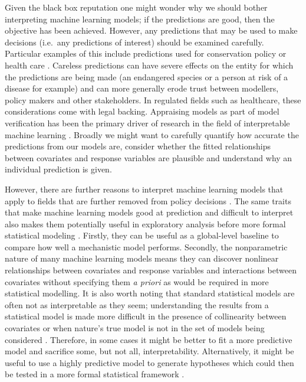 \documentclass[12pt]{article}
\begin{document}
Given the black box reputation one might wonder why we should bother interpreting machine learning models; if the predictions are good, then the objective has been achieved.
However, any predictions that may be used to make decisions (i.e.~any predictions of interest) should be examined carefully.
Particular examples of this include predictions used for conservation policy or health care \citep{vayena2018machine}.
Careless predictions can have severe effects on the entity for which the predictions are being made (an endangered species or a person at risk of a disease for example) and can more generally erode trust between modellers, policy makers and other stakeholders.
In regulated fields such as healthcare, these considerations come with legal backing.
Appraising models as part of model verification has been the primary driver of research in the field of interpretable machine learning \citep{molnar, ribeiro2016should}.
Broadly we might want to carefully quantify how accurate the predictions from our models are, consider whether the fitted relationships between covariates and response variables are plausible and understand why an individual prediction is given.


However, there are further reasons to interpret machine learning models that apply to fields that are further removed from policy decisions \citep{elith2009species}.
The same traits that make machine learning models good at prediction and difficult to interpret also makes them potentially useful in exploratory analysis before more formal statistical modeling \citep{zhao2017causal, gelman2014statistical, nosek2012scientific}.
Firstly, they can be useful as a global-level baseline to compare how well a mechanistic model performs.
Secondly, the nonparametric nature of many machine learning models means they can discover nonlinear relationships between covariates and response variables and interactions between covariates without specifying them \emph{a priori} as would be required in more statistical modelling.
It is also worth noting that standard statistical models are often not as interpretable as they seem; understanding the results from a statistical model is made more difficult in the presence of collinearity between covariates or when nature's true model is not in the set of models being considered \citep{lyddon2018nonparametric, yao2017using}.
Therefore, in some cases it might be better to fit a more predictive model and sacrifice some, but not all, interpretability.
Alternatively, it might be useful to use a highly predictive model to generate hypotheses which could then be tested in a more formal statistical framework \citep{zhao2017causal}.
\end{document}
